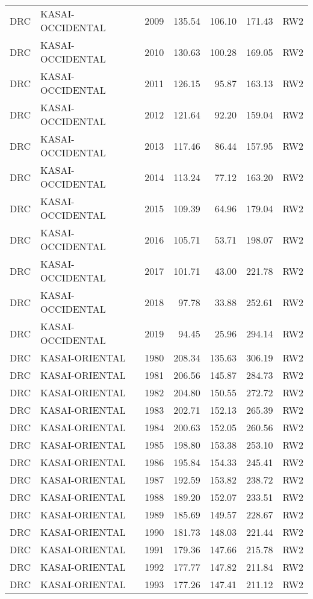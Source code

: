 \begin{longtable}{lllrrrl}
  DRC & KASAI-OCCIDENTAL & 2009 & 135.54 & 106.10 & 171.43 & RW2 \\ 
  DRC & KASAI-OCCIDENTAL & 2010 & 130.63 & 100.28 & 169.05 & RW2 \\ 
  DRC & KASAI-OCCIDENTAL & 2011 & 126.15 & 95.87 & 163.13 & RW2 \\ 
  DRC & KASAI-OCCIDENTAL & 2012 & 121.64 & 92.20 & 159.04 & RW2 \\ 
  DRC & KASAI-OCCIDENTAL & 2013 & 117.46 & 86.44 & 157.95 & RW2 \\ 
  DRC & KASAI-OCCIDENTAL & 2014 & 113.24 & 77.12 & 163.20 & RW2 \\ 
  DRC & KASAI-OCCIDENTAL & 2015 & 109.39 & 64.96 & 179.04 & RW2 \\ 
  DRC & KASAI-OCCIDENTAL & 2016 & 105.71 & 53.71 & 198.07 & RW2 \\ 
  DRC & KASAI-OCCIDENTAL & 2017 & 101.71 & 43.00 & 221.78 & RW2 \\ 
  DRC & KASAI-OCCIDENTAL & 2018 & 97.78 & 33.88 & 252.61 & RW2 \\ 
  DRC & KASAI-OCCIDENTAL & 2019 & 94.45 & 25.96 & 294.14 & RW2 \\ 
  DRC & KASAI-ORIENTAL & 1980 & 208.34 & 135.63 & 306.19 & RW2 \\ 
  DRC & KASAI-ORIENTAL & 1981 & 206.56 & 145.87 & 284.73 & RW2 \\ 
  DRC & KASAI-ORIENTAL & 1982 & 204.80 & 150.55 & 272.72 & RW2 \\ 
  DRC & KASAI-ORIENTAL & 1983 & 202.71 & 152.13 & 265.39 & RW2 \\ 
  DRC & KASAI-ORIENTAL & 1984 & 200.63 & 152.05 & 260.56 & RW2 \\ 
  DRC & KASAI-ORIENTAL & 1985 & 198.80 & 153.38 & 253.10 & RW2 \\ 
  DRC & KASAI-ORIENTAL & 1986 & 195.84 & 154.33 & 245.41 & RW2 \\ 
  DRC & KASAI-ORIENTAL & 1987 & 192.59 & 153.82 & 238.72 & RW2 \\ 
  DRC & KASAI-ORIENTAL & 1988 & 189.20 & 152.07 & 233.51 & RW2 \\ 
  DRC & KASAI-ORIENTAL & 1989 & 185.69 & 149.57 & 228.67 & RW2 \\ 
  DRC & KASAI-ORIENTAL & 1990 & 181.73 & 148.03 & 221.44 & RW2 \\ 
  DRC & KASAI-ORIENTAL & 1991 & 179.36 & 147.66 & 215.78 & RW2 \\ 
  DRC & KASAI-ORIENTAL & 1992 & 177.77 & 147.82 & 211.84 & RW2 \\ 
  DRC & KASAI-ORIENTAL & 1993 & 177.26 & 147.41 & 211.12 & RW2 \\ 

\end{longtable}
